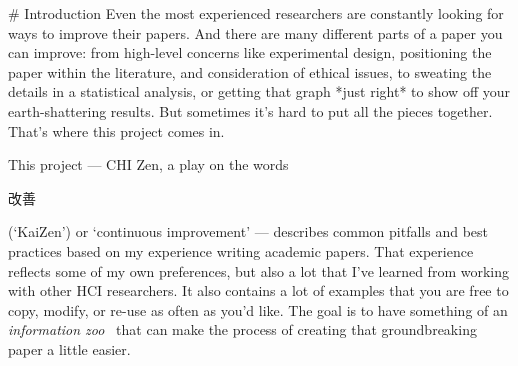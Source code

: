 

\begin{markdown}

# Introduction
Even the most experienced researchers are constantly looking for ways to improve their papers. And there are many different parts of a paper you can improve: from high-level concerns like experimental design, positioning the paper within the literature, and consideration of ethical issues, to sweating the details in a statistical analysis, or getting that graph *just right* to show off your earth-shattering results. But sometimes it's hard to put all the pieces together. That's where this project comes in. 
\end{markdown}

This project --- CHI Zen, a play on the words \begin{CJK}{UTF8}{min}改善\end{CJK} (`KaiZen') or `continuous improvement' --- describes common pitfalls and best practices based on my experience writing academic papers. That experience reflects some of my own preferences, but also a lot that I've learned from working with other HCI researchers. It also contains a lot of examples that you are free to copy, modify, or re-use as often as you'd like. The goal is to have something of an \emph{information zoo}~\citep{heer2010tour} that can make the process of creating that groundbreaking paper a little easier. 

